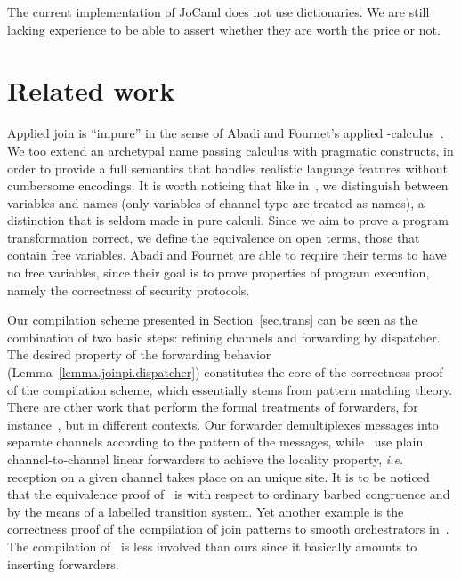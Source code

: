 \documentclass{LMCS}
\makeatletter
\newcommand{\ie}{\emph{i.e.}\@\xspace}
\newcommand{\jocaml}{\textrm{JoCaml}\xspace}
\renewcommand{\_}{\mathord{\rule[-.25ex]{1ex}{.15ex}}}
\makeatother
\begin{document}
The current implementation of \jocaml does not use dictionaries.  We
are still lacking experience to be able to assert whether they are
worth the price or not.

\section{Related work}
\label{sec.relatedwork}

Applied join is ``impure'' in the sense of Abadi and Fournet's
applied -calculus~\cite{AppliedPi}. We too extend an archetypal
name passing calculus with pragmatic constructs, in order to provide a
full semantics that handles realistic language features without
cumbersome encodings.  It is worth noticing that like
in~\cite{AppliedPi}, we distinguish between variables and names (only
variables of channel type are treated as names), a distinction that is
seldom made in pure calculi. Since we aim to prove a program
transformation correct, we define the equivalence on open terms, those
that contain free variables. Abadi and Fournet are able to require
their terms to have no free variables, since their goal is to prove
properties of program execution, namely the correctness of security
protocols.

Our compilation scheme presented in Section~\ref{sec.trans} can be
seen as the combination of two basic steps: refining channels and
forwarding by dispatcher. The desired property of the forwarding
behavior (Lemma~\ref{lemma.joinpi.dispatcher}) constitutes the core of
the correctness proof of the compilation scheme, which essentially
stems from pattern matching theory. There are other work that perform
the formal treatments of forwarders, for
instance~\cite{Merro98asynchrony,Gardner2003lf}, but in different
contexts. Our forwarder demultiplexes messages into separate channels
according to the pattern of the messages,
while~\cite{Merro98asynchrony,Gardner2003lf} use plain
channel-to-channel linear forwarders to achieve the locality property,
\ie reception on a given channel takes place on an unique site.
It is to be noticed that the equivalence proof of~\cite{Gardner2003lf}
is with respect to ordinary barbed congruence
and by the means of a labelled transition system.
Yet another example is the correctness proof of the compilation of
join patterns to smooth orchestrators in~\cite{Orchestrators}.
The compilation of~\cite{Orchestrators} is less involved than ours
since it basically amounts to inserting forwarders.
\end{document}
